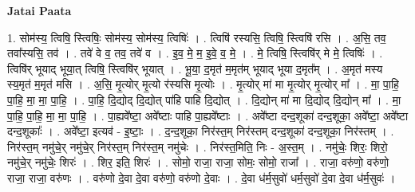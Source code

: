\documentclass[17pt]{extarticle}
\begin{document}
\textbf{Jatai Paata} \newline

1. सोम॑स्य॒ त्विषि॒ स्त्विषिः॒ सोम॑स्य॒ सोम॑स्य॒ त्विषिः॑ । . त्विषि॑ रस्यसि॒ त्विषि॒ स्त्विषि॑ रसि । . अ॒सि॒ तव॒ तवा᳚स्यसि॒ तव॑ । . तवे॑ वे व॒ तव॒ तवे॑ व । . इ॒व॒ मे॒ म॒ इ॒वे॒ व॒ मे॒ । . मे॒ त्विषि॒ स्त्विषि॑र् मे मे॒ त्विषिः॑ । . त्विषि॑र् भूयाद् भूया॒त् त्विषि॒ स्त्विषि॑र् भूयात् । . भू॒या॒ द॒मृत॑ म॒मृत॑म् भूयाद् भूया द॒मृत᳚म् । . अ॒मृत॑ मस्य स्य॒मृत॑ म॒मृत॑ मसि । . अ॒सि॒ मृ॒त्योर् मृ॒त्यो र॑स्यसि मृ॒त्योः । . मृ॒त्योर् मा॑ मा मृ॒त्योर् मृ॒त्योर् मा᳚ । . मा॒ पा॒हि॒ पा॒हि॒ मा॒ मा॒ पा॒हि॒ । . पा॒हि॒ दि॒द्योद् दि॒द्योत् पा॑हि पाहि दि॒द्योत् । . दि॒द्योन् मा॑ मा दि॒द्योद् दि॒द्योन् मा᳚ । . मा॒ पा॒हि॒ पा॒हि॒ मा॒ मा॒ पा॒हि॒ । . पा॒ह्यवे᳚ष्टा॒ अवे᳚ष्टाः पाहि पा॒ह्यवे᳚ष्टाः । . अवे᳚ष्टा दन्द॒शूका॑ दन्द॒शूका॒ अवे᳚ष्टा॒ अवे᳚ष्टा दन्द॒शूकाः᳚ । . अवे᳚ष्टा॒ इत्यव॑ - इ॒ष्टाः॒ । . द॒न्द॒शूका॒ निर॑स्त॒म् निर॑स्तम् दन्द॒शूका॑ दन्द॒शूका॒ निर॑स्तम् । . निर॑स्त॒म् नमु॑चे॒र् नमु॑चे॒र् निर॑स्त॒म् निर॑स्त॒म् नमु॑चेः । . निर॑स्त॒मिति॒ निः - अ॒स्त॒म् । . नमु॑चेः॒ शिरः॒ शिरो॒ नमु॑चे॒र् नमु॑चेः॒ शिरः॑ । . शिर॒ इति॒ शिरः॑ । . सोमो॒ राजा॒ राजा॒ सोमः॒ सोमो॒ राजा᳚ । . राजा॒ वरु॑णो॒ वरु॑णो॒ राजा॒ राजा॒ वरु॑णः । . वरु॑णो दे॒वा दे॒वा वरु॑णो॒ वरु॑णो दे॒वाः । . दे॒वा ध॑र्म॒सुवो॑ धर्म॒सुवो॑ दे॒वा दे॒वा ध॑र्म॒सुवः॑ । \newline
\end{document}
